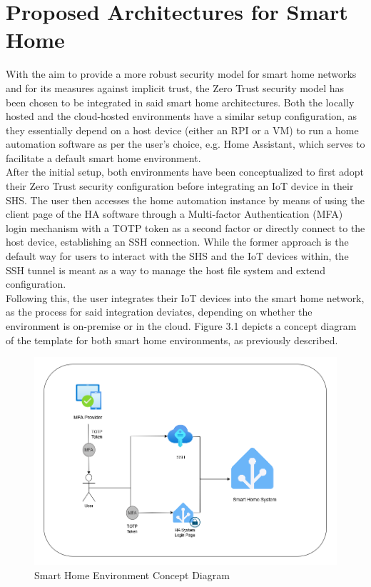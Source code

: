 \section{Proposed Architectures for Smart Home}
With the aim to provide a more robust security model for smart home networks and for its measures against implicit trust, the Zero Trust security model has been chosen to be integrated in said smart home architectures. Both the locally hosted and the cloud-hosted environments have a similar setup configuration, as they essentially depend on a host device (either an RPI or a VM) to run a home automation software as per the user's choice, e.g. Home Assistant, which serves to facilitate a default smart home environment.\\
After the initial setup, both environments have been conceptualized to first adopt their Zero Trust security configuration before integrating an IoT device in their SHS. The user then accesses the home automation instance by means of using the client page of the HA software through a Multi-factor Authentication (MFA) login mechanism with a TOTP token as a second factor or directly connect to the host device, establishing an SSH connection. While the former approach is the default way for users to interact with the SHS and the IoT devices within, the SSH tunnel is meant as a way to manage the host file system and extend configuration.\\
Following this, the user integrates their IoT devices into the smart home network, as the process for said integration deviates, depending on whether the environment is on-premise or in the cloud. Figure 3.1 depicts a concept diagram of the template for both smart home environments, as previously described.
\begin{figure}[H]
	\centering
	\includegraphics[width=0.8 \linewidth]{Images/shs-diagram.png}
	\caption{Smart Home Environment Concept Diagram}
	\label{fig:SHS_Arch}
\end{figure}

